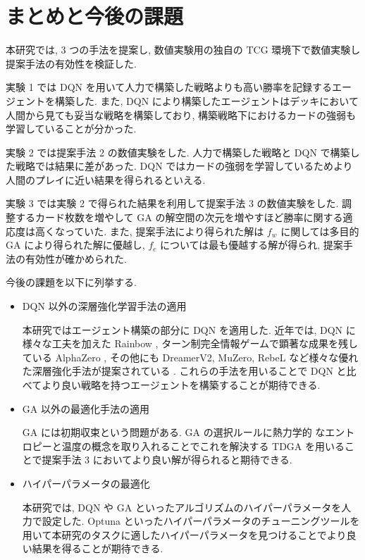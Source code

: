 \newpage
\changeindent{0cm}
\section{まとめと今後の課題}

本研究では, 3 つの手法を提案し, 数値実験用の独自の TCG 環境下で数値実験し提案手法の有効性を検証した.
\par
実験 1 では DQN を用いて人力で構築した戦略よりも高い勝率を記録するエージェントを構築した. また, DQN により構築したエージェントはデッキにおいて人間から見ても妥当な戦略を構築しており, 構築戦略下におけるカードの強弱も学習していることが分かった.
\par
実験 2 では提案手法 2 の数値実験をした. 人力で構築した戦略と DQN で構築した戦略では結果に差があった. DQN ではカードの強弱を学習しているためより人間のプレイに近い結果を得られるといえる.
\par
実験 3 では実験 2 で得られた結果を利用して提案手法 3 の数値実験をした. 調整するカード枚数を増やして GA の解空間の次元を増やすほど勝率に関する適応度は高くなっていた. 
また, 提案手法により得られた解は $f_w$ に関しては多目的 GA により得られた解に優越し, $f_c$ については最も優越する解が得られ, 提案手法の有効性が確かめられた.\par
今後の課題を以下に列挙する.
\begin{itemize}
  \small
  \setlength{\itemsep}{0cm} %
  \item DQN 以外の深層強化学習手法の適用
  \par
  本研究ではエージェント構築の部分に DQN を適用した. 近年では, DQN に様々な工夫を加えた Rainbow \cite{Rainbow}, ターン制完全情報ゲームで顕著な成果を残している AlphaZero , その他にも DreamerV2, MuZero, RebeL など様々な優れた深層強化手法が提案されている \cite{DreamerV2}\cite{MuZero}\cite{ReBeL}. これらの手法を用いることで DQN と比べてより良い戦略を持つエージェントを構築することが期待できる.
  \item GA 以外の最適化手法の適用\par
  GA には初期収束という問題がある. GA の選択ルールに熱力学的
  なエントロピーと温度の概念を取り入れることでこれを解決する TDGA \cite{TDGA} を用いることで提案手法 3 においてより良い解が得られると期待できる.
  \item ハイパーパラメータの最適化
  \par
  本研究では, DQN や GA といったアルゴリズムのハイパーパラメータを人力で設定した. Optuna \cite{Optuna} といったハイパーパラメータのチューニングツールを用いて本研究のタスクに適したハイパーパラメータを見つけることでより良い結果を得ることが期待できる.
\end{itemize}




\changeindent{2cm}